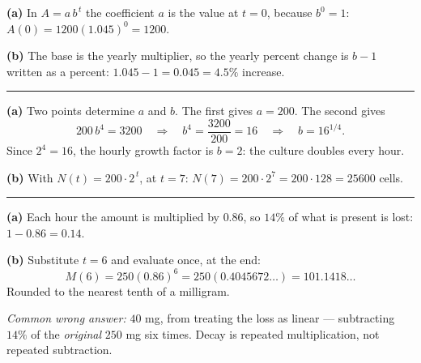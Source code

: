 \documentclass[12pt]{article}
\begin{document}



\textbf{(a)} In $A = a\,b^{\,t}$ the coefficient $a$ is the value at $t = 0$, because $b^0 = 1$:
$A(0) = 1200(1.045)^0 = 1200$. 

\textbf{(b)} The base is the yearly multiplier, so the yearly percent change is $b - 1$ written as a percent: $1.045 - 1 = 0.045 = 4.5\%$ increase. 

\vspace{0.2cm}\noindent\rule{\linewidth}{0.2pt}\vspace{0.2cm}


\textbf{(a)} Two points determine $a$ and $b$. The first gives $a = 200$. The second gives
\[ 200\,b^{4} = 3200 \quad\Longrightarrow\quad b^{4} = \frac{3200}{200} = 16 \quad\Longrightarrow\quad b = 16^{1/4}. \]
Since $2^4 = 16$, the hourly growth factor is $b = 2$: the culture doubles every hour. 

\textbf{(b)} With $N(t) = 200 \cdot 2^{\,t}$, at $t = 7$: $N(7) = 200 \cdot 2^{7} = 200 \cdot 128 = 25600$ cells. 

\vspace{0.2cm}\noindent\rule{\linewidth}{0.2pt}\vspace{0.2cm}


\textbf{(a)} Each hour the amount is multiplied by $0.86$, so $14\%$ of what is present is lost: $1 - 0.86 = 0.14$. 

\textbf{(b)} Substitute $t = 6$ and evaluate once, at the end:
\[ M(6) = 250(0.86)^{6} = 250(0.4045672\ldots) = 101.1418\ldots \]
Rounded to the nearest tenth of a milligram. 

\smallskip
\noindent\textit{Common wrong answer:} $40$ mg, from treating the loss as linear --- subtracting $14\%$ of the \emph{original} $250$ mg six times. Decay is repeated multiplication, not repeated subtraction.
\end{document}
